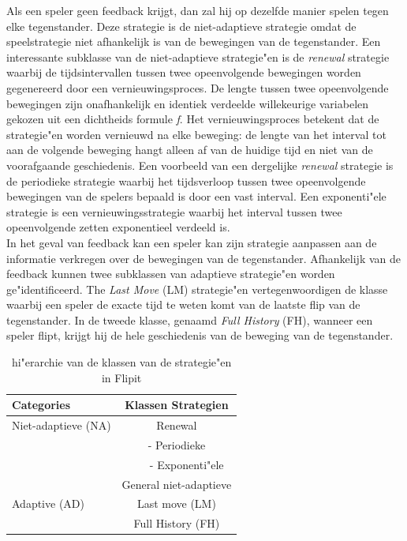 \documentclass[master=cws, masteroption=vs,english]{kulemt}
\begin{document}
\begin{abstract*}
Als een speler geen feedback krijgt, dan zal hij op dezelfde manier spelen tegen elke tegenstander. Deze strategie is de niet-adaptieve strategie omdat de speelstrategie niet afhankelijk is van de bewegingen van de tegenstander. Een interessante subklasse van de niet-adaptieve strategie"en is de \textit{renewal} strategie waarbij de tijdsintervallen tussen twee opeenvolgende bewegingen worden gegenereerd door een vernieuwingsproces. 
De lengte tussen twee opeenvolgende bewegingen zijn onafhankelijk en identiek verdeelde willekeurige variabelen gekozen uit een dichtheids formule \textit{f}. Het vernieuwingsproces betekent dat de strategie"en worden vernieuwd na elke beweging: de lengte van het interval tot aan de volgende beweging hangt alleen af van de huidige tijd en niet van de voorafgaande geschiedenis. Een voorbeeld van een dergelijke \textit{renewal} strategie is de periodieke strategie waarbij het tijdsverloop tussen twee opeenvolgende bewegingen van de spelers bepaald is door een vast interval. Een exponenti"ele strategie is een vernieuwingsstrategie waarbij het interval tussen twee opeenvolgende zetten exponentieel verdeeld is. \\

In het geval van feedback kan een speler kan zijn strategie aanpassen aan de informatie verkregen over de bewegingen van de tegenstander. Afhankelijk van de feedback kunnen twee subklassen van adaptieve strategie"en worden ge"identificeerd. The \textit{Last Move} (LM) strategie"en vertegenwoordigen de klasse waarbij een speler de exacte tijd te weten komt van de laatste flip van de tegenstander. In de tweede klasse, genaamd \textit{Full History} (FH), wanneer een speler flipt, krijgt hij de hele geschiedenis van de beweging van de tegenstander. \\


 \begin{table}
 \center
 \begin {tabular} {l | c}
  \textbf{Categories} & \textbf{Klassen Strategien} \\
  \hline Niet-adaptieve (NA) & Renewal \\
  & - Periodieke \\
  & ~~~ - Exponenti"ele \\
  & General niet-adaptieve \\
  \hline Adaptive (AD) & Last move (LM) \\
  & Full History (FH) \\
\end{tabular}
 \caption{hi"erarchie van de klassen van de strategie"en in Flipit}
 \label{tabel: Strategies}
 \end{table}



\end{abstract*}
\end{document}
